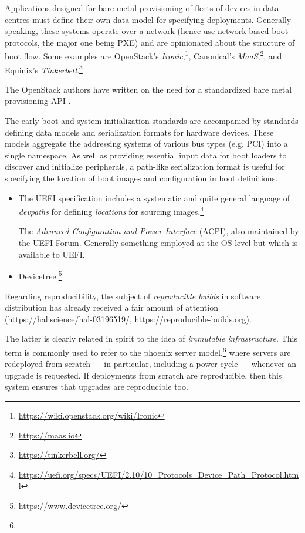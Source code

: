 Applications designed for bare-metal provisioning of fleets of devices in data centres must define their own data model for specifying deployments.
%
Generally speaking, these systems operate over a network (hence use network-based boot protocols, the major one being PXE) and are opinionated about the structure of boot flow.
%
Some examples are OpenStack's \emph{Ironic},\footnote{\url{https://wiki.openstack.org/wiki/Ironic}}, Canonical's \emph{MaaS},\footnote{\url{https://maas.io}}, and Equinix's \emph{Tinkerbell}.\footnote{\url{https://tinkerbell.org/}}

The OpenStack authors have written on the need for a standardized bare metal provisioning API \cite{openstack2023building}.

The early boot and system initialization standards are accompanied by standards defining data models and serialization formats for hardware devices.
%
These models aggregate the addressing systems of various bus types (e.g. PCI) into a single namespace.
%
As well as providing essential input data for boot loaders to discover and initialize peripherals, a path-like serialization format is useful for specifying the location of boot images and configuration in boot definitions.
\begin{itemize}
  \item
    The UEFI specification includes a systematic and quite general language of \emph{devpaths} for defining \emph{locations} for sourcing images.\footnote{\url{https://uefi.org/specs/UEFI/2.10/10\_Protocols\_Device\_Path\_Protocol.html}}

    The \emph{Advanced Configuration and Power Interface} (ACPI), also maintained by the UEFI Forum. Generally something employed at the OS level but which is available to UEFI.
    
  \item
    Devicetree.\footnote{\url{https://www.devicetree.org/}}
\end{itemize}

Regarding reproducibility, the subject of \emph{reproducible builds} in software distribution has already received a fair amount of attention \cite{lamb:hal-03196519} (https://hal.science/hal-03196519/, https://reproducible-builds.org).
  
  The latter is clearly related in spirit to the idea of \emph{immutable infrastructure}.
  This term is commonly used to refer to the phoenix server model,\footnote{} where servers are redeployed from scratch --- in particular, including a power cycle --- whenever an upgrade is requested.
  If deployments from scratch are reproducible, then this system ensures that upgrades are reproducible too.


